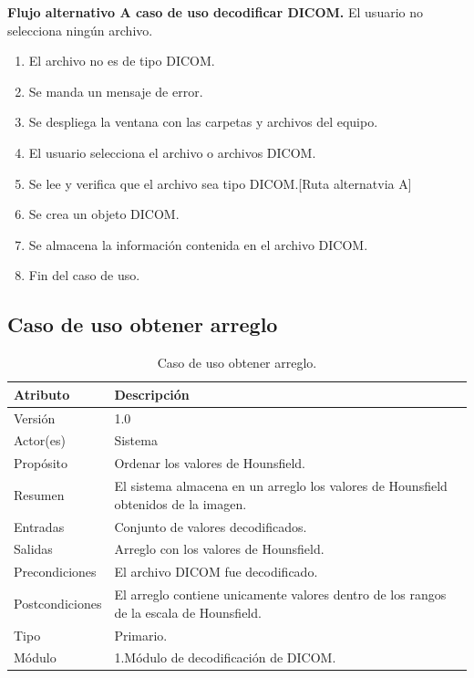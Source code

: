 \documentclass[12pt]{report}
\begin{document}
\textbf{Flujo alternativo A caso de uso decodificar DICOM. }
El usuario no selecciona ningún archivo.
\begin{enumerate}[{A}1{.}]
\item El archivo no es de tipo DICOM.
\item Se manda un mensaje de error.
\item Se despliega la ventana con las carpetas y archivos del equipo.
\item El usuario selecciona el archivo o archivos DICOM.
\item Se lee y verifica que el archivo sea tipo DICOM.[Ruta alternatvia A]
\item Se crea un objeto DICOM.
\item Se almacena la información contenida en el archivo DICOM.
\item Fin del caso de uso.
\end{enumerate}

\subsection{Caso de uso obtener arreglo}
\begin{table}[H]
\begin{center}
\begin{tabular}{|p{25mm}|p{60mm}|}
\hline
Atributo & Descripción\\
\hline \hline 
Versión & 1.0\\
\hline
Actor(es) & Sistema\\
\hline
Propósito & Ordenar los valores de Hounsfield.\\
\hline
Resumen & El sistema almacena en un arreglo los valores de Hounsfield obtenidos de la imagen.\\
\hline
Entradas & Conjunto de valores decodificados.\\
\hline
Salidas & Arreglo con los valores de Hounsfield.\\
\hline
Precondiciones & El archivo DICOM fue decodificado.\\
\hline
Postcondiciones & El arreglo contiene unicamente valores dentro de los rangos de la escala de Hounsfield.\\
\hline
Tipo & Primario.\\
\hline 
Módulo & 1.Módulo de decodificación de DICOM.\\
\hline
\end{tabular}
\caption{Caso de uso obtener arreglo.}
\end{center}
\end{table}
\end{document}
